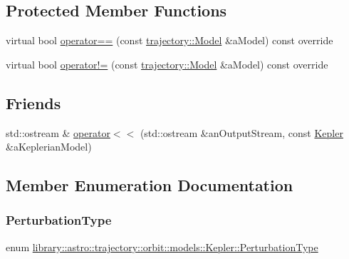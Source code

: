 \subsection*{Protected Member Functions}
\begin{DoxyCompactItemize}
\item 
virtual bool \hyperlink{classlibrary_1_1astro_1_1trajectory_1_1orbit_1_1models_1_1_kepler_af3adc1e4bee0a3064963209b58178e98}{operator==} (const \hyperlink{classlibrary_1_1astro_1_1trajectory_1_1_model}{trajectory\+::\+Model} \&a\+Model) const override
\item 
virtual bool \hyperlink{classlibrary_1_1astro_1_1trajectory_1_1orbit_1_1models_1_1_kepler_a2671d995d476b11a14cc08aad2dc0b30}{operator!=} (const \hyperlink{classlibrary_1_1astro_1_1trajectory_1_1_model}{trajectory\+::\+Model} \&a\+Model) const override
\end{DoxyCompactItemize}
\subsection*{Friends}
\begin{DoxyCompactItemize}
\item 
std\+::ostream \& \hyperlink{classlibrary_1_1astro_1_1trajectory_1_1orbit_1_1models_1_1_kepler_aedb386ce32716dfb187f89b52b023f2b}{operator$<$$<$} (std\+::ostream \&an\+Output\+Stream, const \hyperlink{classlibrary_1_1astro_1_1trajectory_1_1orbit_1_1models_1_1_kepler}{Kepler} \&a\+Keplerian\+Model)
\end{DoxyCompactItemize}


\subsection{Member Enumeration Documentation}
\mbox{\label{classlibrary_1_1astro_1_1trajectory_1_1orbit_1_1models_1_1_kepler_a7f34995d6f287de65a6edb2d419a2fe0}} 
\subsubsection{\texorpdfstring{Perturbation\+Type}{PerturbationType}}
{\footnotesize\ttfamily enum \hyperlink{classlibrary_1_1astro_1_1trajectory_1_1orbit_1_1models_1_1_kepler_a7f34995d6f287de65a6edb2d419a2fe0}{library\+::astro\+::trajectory\+::orbit\+::models\+::\+Kepler\+::\+Perturbation\+Type}\hspace{0.3cm}{\ttfamily [strong]}}

